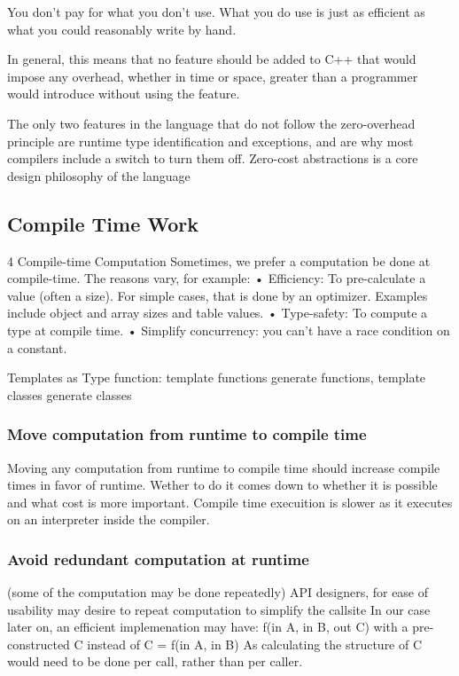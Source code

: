 \documentclass[conference]{IEEEtran}
\begin{document}
    You don't pay for what you don't use.
    What you do use is just as efficient as what you could reasonably write by hand.

In general, this means that no feature should be added to C++ that would impose any overhead, whether in time or space, greater than a programmer would introduce without using the feature.

The only two features in the language that do not follow the zero-overhead principle are runtime type identification and exceptions, and are why most compilers include a switch to turn them off.
Zero-cost abstractions is a core design philosophy of the \cpp{} language

\subsection{Compile Time Work}

4 Compile-time Computation
Sometimes, we prefer a computation be done at compile-time. The reasons
vary, for example:
• Efficiency: To pre-calculate a value (often a size). For simple cases, that is
done by an optimizer. Examples include object and array sizes and table
values.
• Type-safety: To compute a type at compile time.
• Simplify concurrency: you can’t have a race condition on a constant.

\cite[p.~6]{stroustrup_foundations_2011}

Templates as Type function: template functions generate functions, template classes
generate classes
\cite[p.~21]{stroustrup_foundations_2011}

\subsubsection{Move computation from runtime to compile time}
Moving any computation from runtime to compile time should increase compile
times in favor of runtime.
Wether to do it comes down to whether it is possible and what cost is more
important.
Compile time execuition is slower as it executes on an interpreter inside the
compiler.

\subsubsection{Avoid redundant computation at runtime}
(some of the computation may be done repeatedly)
API designers, for ease of usability may desire to repeat computation to
simplify the callsite
In our case later on, an efficient implemenation may have:
f(in A, in B, out C) with a pre-constructed C
instead of 
C = f(in A, in B)
As calculating the structure of C would need to be done per call, rather than
per caller.
\end{document}
